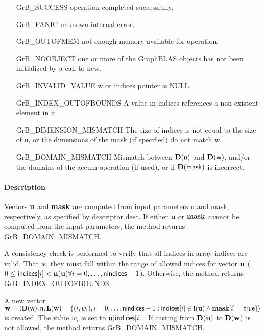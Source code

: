 \begin{itemize}[leftmargin=2.1in]
\item[{\sf GrB\_SUCCESS}]    operation completed successfully.
\item[{\sf GrB\_PANIC}]      unknown internal error.
\item[{\sf GrB\_OUTOFMEM}]   not enough memory available for operation.
\item[{\sf GrB\_NOOBJECT}]   one or more of the GraphBLAS objects has
                             not been initialized by a call to {\sf new}.
\item[{\sf GrB\_INVALID\_VALUE}]    {\sf w} or {\sf indices} pointer is {\sf NULL}.

\item[{\sf GrB\_INDEX\_OUTOFBOUNDS}]
        A value in {\sf indices} references a non-existent element in {\sf u}.
\item[{\sf GrB\_DIMENSION\_MISMATCH}] 
        The size of {\sf indices} is not equal to the size of {\sf u}, or
        the dimensions of the mask (if specified) do not match {\sf w}.
\item[{\sf GrB\_DOMAIN\_MISMATCH}]   Mismatch between $\bold{D}({\sf u})$ and
                                     $\bold{D}({\sf w})$, and/or the domains of the 
                                     {\sf accum} operation (if used), or if 
                                     $\bold{D}(\sf mask)$ is incorrect.
\end{itemize}

\paragraph{Description}

Vectors ${\bf u}$ and ${\bf mask}$ are computed from input
parameters {\sf u} and {\sf mask}, respectively, as specified by
descriptor {\sf desc}.  If either ${\bf u}$ or ${\bf mask}$
cannot be computed from the input parameters, the method returns {\sf
GrB\_DOMAIN\_MISMATCH}.

A consistency check is performed to verify that all indices in array
{\sf indices} are valid. That is, they must fall within the range of allowed
indices for vector ${\bf u}$ ($0 \leq {\sf indices}[i] < \bold{n}({\bf u})
\forall i = 0,\ldots,{\sf nindices}-1$).  Otherwise, the method returns {\sf
GrB\_INDEX\_OUTOFBOUNDS}.

A new vector ${\bf w} = \langle \bold{D}({\sf w}),{\sf n},
\bold{L}({\bf w}) = \{ (i,w_i), i = 0,\ldots,{\sf nindices}-1 : {\sf indices}[i]
\in \bold{i}({\bf u}) \wedge {\bf mask}[i] = {\sf true} \} \rangle$
is created.  The value $w_i$ is set to ${\bf u}[{\sf indices}[i]]$. If
casting from $\bold{D}({\bf u})$ to $\bold{D}({\bf w})$ is not
allowed, the method returns {\sf GrB\_DOMAIN\_MISMATCH}.

